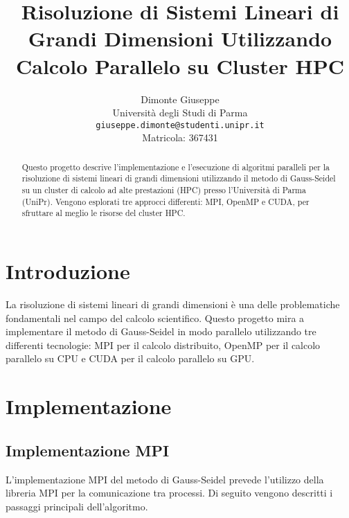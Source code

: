 \documentclass[a4paper,12pt]{article}
\title{Risoluzione di Sistemi Lineari di Grandi Dimensioni Utilizzando Calcolo Parallelo su Cluster HPC}
\author{Dimonte Giuseppe\\
Università degli Studi di Parma\\
\texttt{giuseppe.dimonte@studenti.unipr.it}\\
Matricola: 367431}
\date{}
\begin{document}
\maketitle

\begin{abstract}
Questo progetto descrive l'implementazione e l'esecuzione di algoritmi paralleli per la risoluzione di sistemi lineari di grandi dimensioni utilizzando il metodo di Gauss-Seidel su un cluster di calcolo ad alte prestazioni (HPC) presso l'Università di Parma (UniPr). Vengono esplorati tre approcci differenti: MPI, OpenMP e CUDA, per sfruttare al meglio le risorse del cluster HPC.
\end{abstract}

\tableofcontents

\section{Introduzione}
La risoluzione di sistemi lineari di grandi dimensioni è una delle problematiche fondamentali nel campo del calcolo scientifico. Questo progetto mira a implementare il metodo di Gauss-Seidel in modo parallelo utilizzando tre differenti tecnologie: MPI per il calcolo distribuito, OpenMP per il calcolo parallelo su CPU e CUDA per il calcolo parallelo su GPU.

\section{Implementazione}

\subsection{Implementazione MPI}
L'implementazione MPI del metodo di Gauss-Seidel prevede l'utilizzo della libreria MPI per la comunicazione tra processi. Di seguito vengono descritti i passaggi principali dell'algoritmo.
\end{document}
